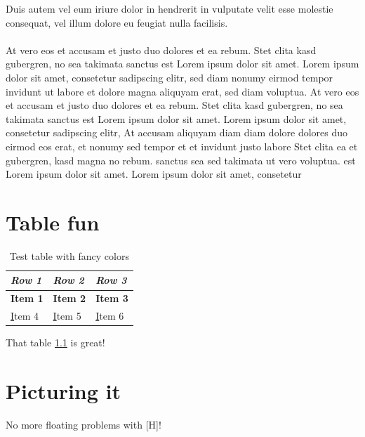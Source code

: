 \documentclass[bibliography=totoc,listof=totoc,BCOR=5mm,DIV=12,oneside]{scrbook}
\begin{document}
Duis autem vel eum iriure dolor in hendrerit in vulputate velit esse molestie consequat, vel illum dolore eu feugiat nulla facilisis.\\\\   

At vero eos et accusam et justo duo dolores et ea rebum. Stet clita kasd gubergren, no sea takimata sanctus est Lorem ipsum dolor sit amet. Lorem ipsum dolor sit amet, consetetur sadipscing elitr, sed diam nonumy eirmod tempor invidunt ut labore et dolore magna aliquyam erat, sed diam voluptua. At vero eos et accusam et justo duo dolores et ea rebum. Stet clita kasd gubergren, no sea takimata sanctus est Lorem ipsum dolor sit amet. Lorem ipsum dolor sit amet, consetetur sadipscing elitr, At accusam aliquyam diam diam dolore dolores duo eirmod eos erat, et nonumy sed tempor et et invidunt justo labore Stet clita ea et gubergren, kasd magna no rebum. sanctus sea sed takimata ut vero voluptua. est Lorem ipsum dolor sit amet. Lorem ipsum dolor sit amet, consetetur

\chapter{Table fun}

\begin{longtable}[c]{@{}l|l|l@{}}
\caption{Test table with fancy colors}
\label{my-table}\\
\rowcolor[HTML]{FFCCC9} 
\textit{Row 1} & \textit{Row 2} & \textit{Row 3} \\* \midrule
\endfirsthead
%
\endhead
%
{\color[HTML]{3531FF} \textbf{Item 1}} & {\color[HTML]{3531FF} \textbf{Item 2}} & {\color[HTML]{3531FF} \textbf{Item 3}} \\
{\color[HTML]{036400} {\ul Item 4}} & {\color[HTML]{036400} {\ul Item 5}} & {\color[HTML]{036400} {\ul Item 6}}
\end{longtable}

That table \ref{my-table} is great!

\newpage\chapter{Picturing it}

No more floating problems with [H]!
\end{document}
